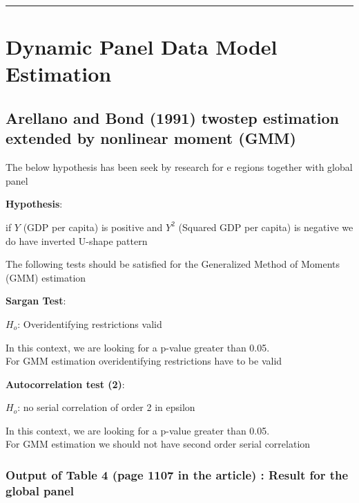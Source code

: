 \documentclass[
  11pt,
]{article}
\begin{document}
\begin{center}\rule{0.5\linewidth}{0.5pt}\end{center}

\hypertarget{dynamic-panel-data-model-estimation}{%
\section{Dynamic Panel Data Model
Estimation}\label{dynamic-panel-data-model-estimation}}

\hypertarget{arellano-and-bond-1991-twostep-estimation-extended-by-nonlinear-moment-gmm}{%
\subsection{Arellano and Bond (1991) twostep estimation extended by
nonlinear moment
(GMM)}\label{arellano-and-bond-1991-twostep-estimation-extended-by-nonlinear-moment-gmm}}

The below hypothesis has been seek by research for e regions together
with global panel

\textbf{Hypothesis}:

if \(Y\) (GDP per capita) is positive and \(Y^2\) (Squared GDP per
capita) is negative we do have inverted U-shape pattern

The following tests should be satisfied for the Generalized Method of
Moments (GMM) estimation

\textbf{Sargan Test}:

\(H_o\): Overidentifying restrictions valid

In this context, we are looking for a p-value greater than 0.05.\\
For GMM estimation overidentifying restrictions have to be valid

\textbf{Autocorrelation test (2)}:

\(H_o\): no serial correlation of order 2 in epsilon

In this context, we are looking for a p-value greater than 0.05.\\
For GMM estimation we should not have second order serial correlation

\hypertarget{output-of-table-4-page-1107-in-the-article-result-for-the-global-panel}{%
\subsubsection{Output of Table 4 (page 1107 in the article) : Result for
the global
panel}\label{output-of-table-4-page-1107-in-the-article-result-for-the-global-panel}}
\end{document}
